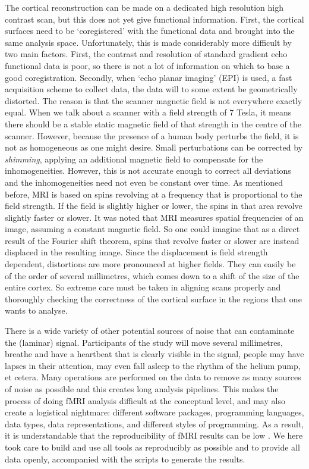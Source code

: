 The cortical reconstruction can be made on a dedicated high resolution high contrast scan, but this does not yet give functional information. First, the cortical surfaces need to be `coregistered' with the functional data and brought into the same analysis space. Unfortunately, this is made considerably more difficult by two main factors. First, the contrast and resolution of standard gradient echo functional data is poor, so there is not a lot of information on which to base a good coregistration. Secondly, when `echo planar imaging' (EPI) is used, a fast acquisition scheme to collect data, the data will to some extent be geometrically distorted. The reason is that the scanner magnetic field is not everywhere exactly equal. When we talk about a scanner with a field strength of 7 Tesla, it means there should be a stable static magnetic field of that strength in the centre of the scanner. However, because the presence of a human body perturbs the field, it is not as homogeneous as one might desire. Small perturbations can be corrected by \emph{shimming}, applying an additional magnetic field to compensate for the inhomogeneities. However, this is not accurate enough to correct all deviations and the inhomogeneities need not even be constant over time. As mentioned before, MRI is based on spins revolving at a frequency that is proportional to the field strength. If the field is slightly higher or lower, the spins in that area revolve slightly faster or slower. It was noted that MRI measures spatial frequencies of an image, assuming a constant magnetic field. So one could imagine that as a direct result of the Fourier shift theorem, spins that revolve faster or slower are instead displaced in the resulting image. Since the displacement is field strength dependent, distortions are more pronounced at higher fields. They can easily be of the order of several millimetres, which comes down to a shift of the size of the entire cortex. So extreme care must be taken in aligning scans properly and thoroughly checking the correctness of the cortical surface in the regions that one wants to analyse. %

There is a wide variety of other potential sources of noise that can contaminate the (laminar) signal. Participants of the study will move several millimetres, breathe and have a heartbeat that is clearly visible in the signal, people may have lapses in their attention, may even fall asleep to the rhythm of the helium pump, et cetera. Many operations are performed on the data to remove as many sources of noise as possible and this creates long analysis pipelines. This makes the process of doing fMRI analysis difficult at the conceptual level, and may also create a logistical nightmare: different software packages, programming languages, data types, data representations, and different styles of programming. As a result, it is understandable that the reproducibility of fMRI results can be low \cite{Nosek2015,Gorgolewski2016a}. We here took care to build and use all tools as reproducibly as possible and to provide all data openly, accompanied with the scripts to generate the results.

